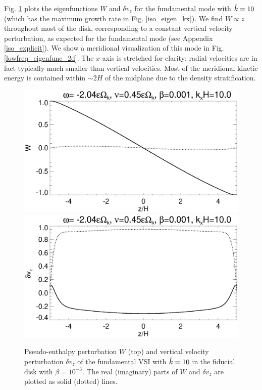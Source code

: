 Fig. \ref{lowfreq_eigenfunc} plots the eigenfunctions $W$ and $\delta 
v_z$ for the fundamental mode with $\hat{k}=10$ (which has the 
maximum growth rate in Fig. \ref{iso_eigen_kx}). We find $W\propto z$
throughout most of the disk, corresponding to a constant vertical
velocity perturbation, as expected for the fundamental mode (see
Appendix \ref{iso_explicit}). We show a meridional visualization of
this mode in Fig. \ref{lowfreq_eigenfunc_2d}. The $x$ axis is
stretched for clarity; radial velocities are in fact typically much 
smaller than vertical velocities. Most of the meridional kinetic energy is
contained within $\sim 2H$ of the midplane due to the density 
stratification. 

\begin{figure}
  \includegraphics[width=\linewidth,clip=true,trim=0cm 1.75cm 0cm
  0cm]{figures/eigenvectorW_iso} 
  \includegraphics[width=\linewidth,clip=true,trim=0cm 0cm 0cm
  1cm]{figures/eigenvectorvz_iso}
  \caption{Pseudo-enthalpy perturbation $W$ (top) and vertical velocity
    perturbation $\delta v_z$ of the fundamental VSI with 
    $\hat{k}=10$ in the fiducial disk with $\beta=10^{-3}$. The real 
    (imaginary) parts of $W$ and $\delta v_z$ are plotted as solid
    (dotted) lines. 
    \label{lowfreq_eigenfunc}
  }
\end{figure}


